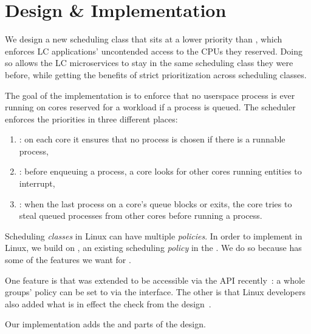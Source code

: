 \section{Design \& Implementation}

We design a new scheduling class \beclass{} that sits at a lower priority than
\normalclass{}, which enforces LC applications' uncontended access to the CPUs
they reserved. Doing so allows the LC microservices to stay in the same
scheduling class they were before, while getting the benefits of strict
prioritization across scheduling classes.

The goal of the implementation is to enforce that no \beclass{} userspace
process is ever running on cores reserved for a \normalclass{} workload if a
\normalclass{} process is queued. The scheduler enforces the priorities in three
different places:
\begin{enumerate}
    \item \local: on each core it ensures that no \beclass{} process is chosen
        if there is a runnable \normalclass{} process,
    \item \entry: before enqueuing a \normalclass{} process, a core looks for
        other cores running \beclass{} entities to interrupt,
    \item \exit: when the last \normalclass{} process on a core's queue blocks
        or exits, the core tries to steal queued \normalclass{} processes from
        other cores before running a \beclass{} process.
\end{enumerate}

Scheduling \textit{classes} in Linux can have multiple \textit{policies}. In
order to implement \beclass{} in Linux, we build on \schedidle{}, an existing
scheduling \textit{policy} in the \normalclass{}. We do so because \schedidle{}
has some of the features we want for \beclass{}. 

One feature is that \schedidle{} was extended to be accessible via the
\cgroups{} API recently~\cite{lkml-idle-cgroup}: a whole groups' policy can be
set to \schedidle{} via the \cgroups{} interface. The other is that Linux
developers also added what is in effect the \entry{} check from the \beclass{}
design~\cite{fixing-idle-article}.

Our implementation adds the \local{} and \exit{} parts of the \beclass{} design.
